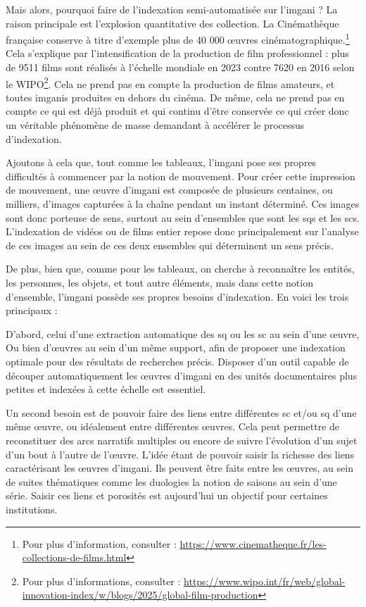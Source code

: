 Mais alors, pourquoi faire de l'indexation semi-automatisée sur l'\gls{imgani} ? La raison principale est l'explosion quantitative des collection. La Cinémathèque française conserve à titre d'exemple plus de 40 000 \oe{uvres} cinématographique.\footnote{Pour plus d'information, consulter : \url{https://www.cinematheque.fr/les-collections-de-films.html}} Cela s'explique par l'intensification de la production de film professionnel : plus de 9511 films sont réalisés à l'échelle mondiale en 2023 contre 7620 en 2016 selon le WIPO\footnote{Pour plus d'informations, consulter : \url{https://www.wipo.int/fr/web/global-innovation-index/w/blogs/2025/global-film-production}}. Cela ne prend pas en compte la production de films amateurs, et toutes \glspl{imgani} produites en dehors du cinéma. De même, cela ne prend pas en compte ce qui est déjà produit et qui continu d'être conservée ce qui créer donc un véritable phénomène de masse demandant à accélérer le processus d'indexation.

Ajoutons à cela que, tout comme les tableaux, l'\gls{imgani} pose ses propres difficultés à commencer par la notion de mouvement. Pour créer cette impression de mouvement, une \oe{uvre} d'\gls{imgani} est composée de plusieurs centaines, ou milliers, d'images capturées à la chaîne pendant un instant déterminé. Ces images sont donc porteuse de sens, surtout au sein d'ensembles que sont les \glspl{sq} et les \glspl{sc}. L'indexation de vidéos ou de films entier repose donc principalement sur l'analyse de ces images au sein de ces deux ensembles qui déterminent un sens précis. 

De plus, bien que, comme pour les tableaux, on cherche à reconnaître les entités, les personnes, les objets, et tout autre éléments, mais dans cette notion d'ensemble, l'\gls{imgani} possède ses propres besoins d'indexation. En voici les trois principaux :

D'abord, celui d'une extraction automatique des \gls{sq} ou les \gls{sc} au sein d'une \oe{uvre}, Ou bien d'\oe{uvres} au sein d'un même support, afin de proposer une indexation optimale pour des résultats de recherches précis. Disposer d'un outil capable de découper automatiquement les \oe{uvres} d'\gls{imgani} en des unités documentaires plus petites et indexées à cette échelle est essentiel.

Un second besoin est de pouvoir faire des liens entre différentes \gls{sc} et/ou \gls{sq} d'une même \oe{uvre}, ou idéalement entre différentes \oe{uvres}. Cela peut permettre de reconstituer des arcs narratifs multiples ou encore de suivre l'évolution d'un sujet d'un bout à l'autre de l'\oe{uvre}. L'idée étant de pouvoir saisir la richesse des liens caractérisant les \oe{uvres} d'\gls{imgani}. Ils peuvent être faits entre les \oe{uvres}, au sein de suites thématiques comme les duologies la notion de saisons au sein d'une série. Saisir ces liens et porosités est aujourd'hui un objectif pour certaines institutions.

